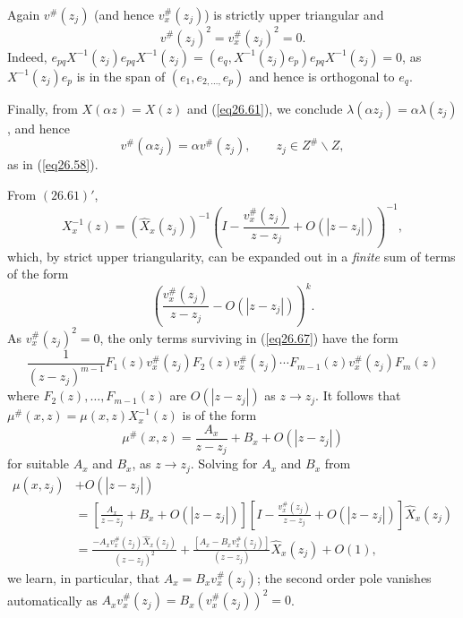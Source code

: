 \documentclass{surv-l}
\theoremstyle{plain}
\theoremstyle{definition}
\numberwithin{equation}{chapter}
\begin{document}
Again $v^{\#}(z_{j})$ (and hence $v_{x}^{\#}(z_{j})$) is strictly upper triangular and
\begin{equation}\label{eq26.65}
v^{\#}(z_{j})^{2}=v_{x}^{\#}(z_{j})^{2}=0.
\end{equation}
Indeed, $e_{pq}X^{-1}(z_{j})e_{pq}X^{-1}(z_{j})=(e_{q}, X^{-1}(z_{j})e_{p})e_{pq}X^{-1}(z_{j})=0$, as $X^{-1}(z_{j})e_{p}$ is in the span of $(e_{1}, e_{2,\ldots,}e_{p})$ and hence is orthogonal to $e_{q}$.

Finally, from $X(\alpha z)=X(z)$ and (\ref{eq26.61}), we conclude $\lambda(\alpha z_{j})=\alpha\lambda(z_{j})$, and hence
\begin{equation}\label{eq26.66}
v^{\#}(\alpha z_{j})=\alpha v^{\#}(z_{j}),\qquad z_{j}\in Z^{\#}\backslash Z,
\end{equation}
as in (\ref{eq26.58}).

From $(26.61)'$,
\begin{equation*}
X_{x}^{-1}(z)=(\hat{X}_{x}(z_{j}))^{-1}\left(I-\frac{v_{x}^{\#}(z_{j})}{z-z_{j}}+O(|z-z_{j}|)\right)^{-1},
\end{equation*}
which, by strict upper triangularity, can be expanded out in a \emph{finite} sum of terms of the form
\begin{equation}\label{eq26.67}
\left(\frac{v_{x}^\#(z_{j})}{z-z_{j}}-O(|z-z_{j}|)\right)^{k}.
\end{equation}
As $v_{x}^{\#}(z_{j})^{2}=0$, the only terms surviving in (\ref{eq26.67}) have the form
\begin{equation*}
\frac{1}{(z-z_{j})^{m-1}}F_{1}(z)v_{x}^{\#}(z_{j})F_{2}(z)v_{x}^{\#}(z_{j}) \cdots F_{m-1}(z)v_{x}^{\#}(z_{j})F_{m}(z)
\end{equation*}
where $F_{2}(z),\ldots, F_{m-1}(z)$ are $O(|z-z_{j}|)$ as $z\rightarrow z_{j}$. It follows that $\mu^{\#}(x, z)= \mu(x, z)X_{x}^{-1}(z)$ is of the form
\begin{equation*}
\mu^{\#}(x, z)=\frac{A_{x}}{z-z_{j}}+B_{x}+O(|z-z_{j}|)
\end{equation*}
for suitable $A_{x}$ and $B_{x}$, as $z\rightarrow z_{j}$. Solving for $A_{x}$ and $B_{x}$ from
\begin{align*}
\mu(x,z_{j})&+O(|z-z_{j}|)\\
&=\left[\frac{A_{x}}{z-z_{j}}+B_{x}+O(|z-z_{j}|)\right]\left[I-\frac{v_{x}^{\#}(z_{j})}{z-z_{j}}+O(|z-z_{j}|)\right]\hat{X}_{x}(z_{j})\\
&=\frac{-A_{x}v_{x}^{\#}(z_{j})\hat{X}_{x}(z_{j})}{(z-z_{j})^{2}}+\frac{[A_{x}-B_{x}v_{x}^{\#}(z_{j})]}{(z-z_{j})}\hat{X}_{x}(z_{j})+O(1),
\end{align*}
we learn, in particular, that $A_{x}=B_{x}v_{x}^{\#} (z_{j})$; the second order pole vanishes automatically as $A_{x}v_{x}^{\#}(z_{j})=B_{x}(v_{x}^{\#}(z_{j}))^{2}=0$.
\end{document}

